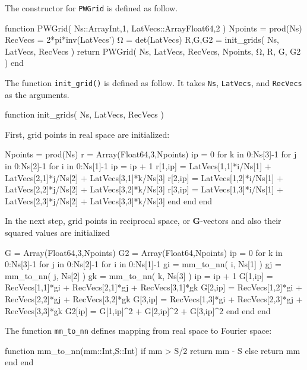The constructor for {\tt PWGrid} is defined as follow.
\begin{juliacode}
function PWGrid( Ns::Array{Int,1}, LatVecs::Array{Float64,2} )
  Npoints = prod(Ns)
  RecVecs = 2*pi*inv(LatVecs')
  Ω = det(LatVecs)
  R,G,G2 = init_grids( Ns, LatVecs, RecVecs )
  return PWGrid( Ns, LatVecs, RecVecs, Npoints, Ω, R, G, G2 )
end
\end{juliacode}

The function {\tt init\_grid()} is defined as follow. It takes
{\tt Ns}, {\tt LatVecs}, and {\tt RecVecs} as the arguments.

\begin{juliacode}
function init_grids( Ns, LatVecs, RecVecs )
\end{juliacode}

First, grid points in real space are initialized:

\begin{juliacode}
  Npoints = prod(Ns)
  r = Array(Float64,3,Npoints)
  ip = 0
  for k in 0:Ns[3]-1
  for j in 0:Ns[2]-1
  for i in 0:Ns[1]-1
    ip = ip + 1
    r[1,ip] = LatVecs[1,1]*i/Ns[1] + LatVecs[2,1]*j/Ns[2]
              + LatVecs[3,1]*k/Ns[3]
    r[2,ip] = LatVecs[1,2]*i/Ns[1] + LatVecs[2,2]*j/Ns[2]
              + LatVecs[3,2]*k/Ns[3]
    r[3,ip] = LatVecs[1,3]*i/Ns[1] + LatVecs[2,3]*j/Ns[2]
              + LatVecs[3,3]*k/Ns[3]
  end
  end
  end
\end{juliacode}

In the next step, grid points in reciprocal space, or \textbf{G}-vectors
and also their squared values are initialized

\begin{juliacode}
  G  = Array(Float64,3,Npoints)
  G2 = Array(Float64,Npoints)
  ip    = 0
  for k in 0:Ns[3]-1
  for j in 0:Ns[2]-1
  for i in 0:Ns[1]-1
    gi = mm_to_nn( i, Ns[1] )
    gj = mm_to_nn( j, Ns[2] )
    gk = mm_to_nn( k, Ns[3] )
    ip = ip + 1
    G[1,ip] = RecVecs[1,1]*gi + RecVecs[2,1]*gj + RecVecs[3,1]*gk
    G[2,ip] = RecVecs[1,2]*gi + RecVecs[2,2]*gj + RecVecs[3,2]*gk
    G[3,ip] = RecVecs[1,3]*gi + RecVecs[2,3]*gj + RecVecs[3,3]*gk
    G2[ip] = G[1,ip]^2 + G[2,ip]^2 + G[3,ip]^2
  end
  end
  end
\end{juliacode}

The function {\tt mm\_to\_nn} defines mapping from real space to Fourier space:

\begin{juliacode}
function mm_to_nn(mm::Int,S::Int)
  if mm > S/2
    return mm - S
  else
    return mm
  end
end
\end{juliacode}

